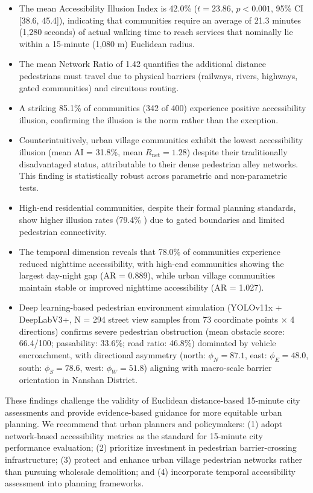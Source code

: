\documentclass[10pt,conference,compsoc]{IEEEtran}
\begin{document}
\begin{table}[htbp]
\begin{center}
\begin{itemize}
    \item The mean Accessibility Illusion Index is 42.0\% ($t = 23.86$, $p < 0.001$, 95\% CI [38.6, 45.4]), indicating that communities require an average of 21.3 minutes (1{,}280 seconds) of actual walking time to reach services that nominally lie within a 15-minute (1{,}080 m) Euclidean radius.
    \item The mean Network Ratio of 1.42 quantifies the additional distance pedestrians must travel due to physical barriers (railways, rivers, highways, gated communities) and circuitous routing.
    \item A striking 85.1\% of communities (342 of 400) experience positive accessibility illusion, confirming the illusion is the norm rather than the exception.
    \item Counterintuitively, urban village communities exhibit the lowest accessibility illusion (mean AI = 31.8\%, mean $R_{\text{net}} = 1.28$) despite their traditionally disadvantaged status, attributable to their dense pedestrian alley networks. This finding is statistically robust across parametric and non-parametric tests.
    \item High-end residential communities, despite their formal planning standards, show higher illusion rates (79.4\% ) due to gated boundaries and limited pedestrian connectivity.
    \item The temporal dimension reveals that 78.0\% of communities experience reduced nighttime accessibility, with high-end communities showing the largest day-night gap (AR = 0.889), while urban village communities maintain stable or improved nighttime accessibility (AR = 1.027).
    \item Deep learning-based pedestrian environment simulation (YOLOv11x + DeepLabV3+, N = 294 street view samples from 73 coordinate points $\times$ 4 directions) confirms severe pedestrian obstruction (mean obstacle score: 66.4/100; passability: 33.6\%; road ratio: 46.8\%) dominated by vehicle encroachment, with directional asymmetry (north: $\phi_N = 87.1$, east: $\phi_E = 48.0$, south: $\phi_S = 78.6$, west: $\phi_W = 51.8$) aligning with macro-scale barrier orientation in Nanshan District.
\end{itemize}

These findings challenge the validity of Euclidean distance-based 15-minute city assessments and provide evidence-based guidance for more equitable urban planning. We recommend that urban planners and policymakers: (1) adopt network-based accessibility metrics as the standard for 15-minute city performance evaluation; (2) prioritize investment in pedestrian barrier-crossing infrastructure; (3) protect and enhance urban village pedestrian networks rather than pursuing wholesale demolition; and (4) incorporate temporal accessibility assessment into planning frameworks.


\end{center}
\end{table}
\end{document}
